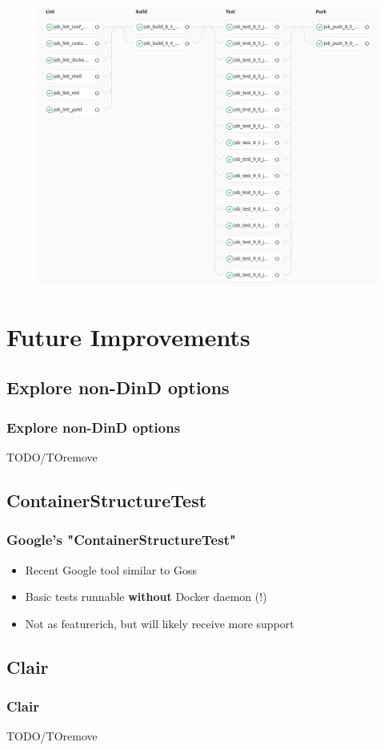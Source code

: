 \documentclass[14pt,aspectratio=169]{beamer}
\begin{document}
\begin{frame}
  \begin{figure}
    \includegraphics[height=0.9\textheight]{images/pipeline_multi.png}
  \end{figure}
\end{frame}

\section{Future Improvements}

\subsection{Explore non-DinD options}

\begin{frame}
  \frametitle{Explore non-DinD options}
TODO/TOremove
\end{frame}

\subsection{ContainerStructureTest}

\begin{frame}
  \frametitle{Google's "ContainerStructureTest"}
  \begin{itemize}
    \item Recent Google tool similar to Goss
    \item Basic tests runnable \textbf{without} Docker daemon (!)
    \item Not as featurerich, but will likely receive more support
  \end{itemize}
\end{frame}

\subsection{Clair}

\begin{frame}
  \frametitle{Clair}
TODO/TOremove
\end{frame}


\section{}

\cernSplashWhite
\end{document}
